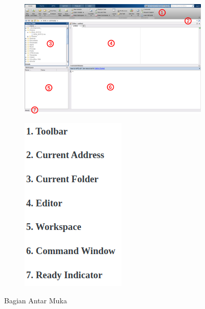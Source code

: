 \documentclass[12pt]{book}
\begin{document}
	\begin{figure}[!ht]
		\centering
		\begin{subfigure}[b]{0.75\textwidth}
			\includegraphics[width=\textwidth]{images/matlabiface}
		\end{subfigure}
		\begin{subfigure}[b]{0.2\textwidth}
			\includegraphics[width=\textwidth]{images/matlabpart}
		\end{subfigure}
		\caption{Bagian Antar Muka}
	\end{figure}
\end{document}
